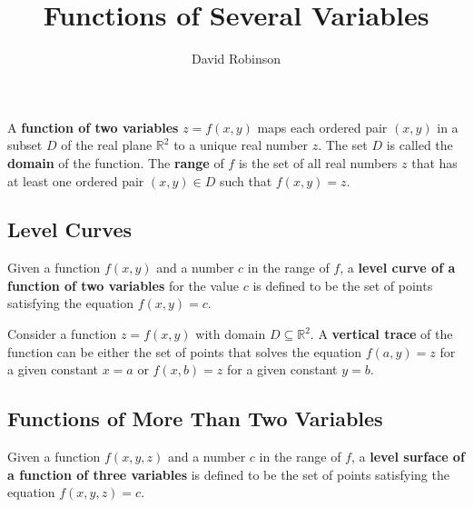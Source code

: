 \documentclass{article}
\title{Functions of Several Variables}
\author{David Robinson}
\date{}
\begin{document}
\maketitle

A \textbf{function of two variables} $z=f(x, y)$ maps each ordered pair $(x, y)$ in a subset $D$ of the real plane $\mathbb{R}^2$ to a unique real number $z$. The set $D$ is called the \textbf{domain} of the function. The \textbf{range} of $f$ is the set of all real numbers $z$ that has at least one ordered pair $(x, y)\in D$ such that $f(x, y)=z$.

\subsection*{Level Curves}

Given a function $f(x, y)$ and a number $c$ in the range of $f$, a \textbf{level curve of a function of two variables} for the value $c$ is defined to be the set of points satisfying the equation $f(x, y)=c$.
\vspace{1em}

Consider a function $z=f(x,y)$ with domain $D\subseteq \mathbb{R}^2$. A \textbf{vertical trace} of the function can be either the set of points that solves the equation $f(a,y)=z$ for a given constant $x=a$ or $f(x,b)=z$ for a given constant $y=b$.

\subsection*{Functions of More Than Two Variables}

Given a function $f(x, y, z)$ and a number $c$ in the range of $f$, a \textbf{level surface of a function of three variables} is defined to be the set of points satisfying the equation $f(x, y, z)=c$.
\end{document}
